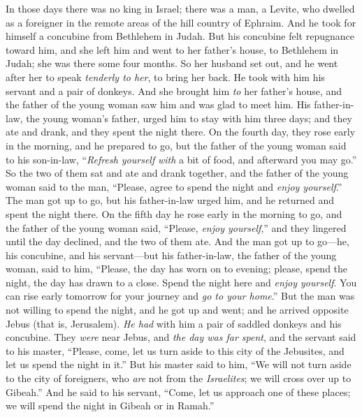 \begin{biblechapter} %
 In those days there was no king in Israel; there was a man, a Levite, who dwelled as a foreigner in the remote areas of the hill country of Ephraim. And he took for himself a concubine from Bethlehem in Judah.
\verse But his concubine felt repugnance toward him, and she left him and went to her father’s house, to Bethlehem in Judah; she was there some four months.
\verse So her husband set out, and he went after her to speak \textit{tenderly to her}, to bring her back. He took with him his servant and a pair of donkeys. And she brought him \textit{to} her father’s house, and the father of the young woman saw him and was glad to meet him.
\verse His father-in-law, the young woman’s father, urged him to stay with him three days; and they ate and drank, and they spent the night there.
\verse On the fourth day, they rose early in the morning, and he prepared to go, but the father of the young woman said to his son-in-law, “\textit{Refresh yourself} \textit{with} a bit of food, and afterward you may go.”
\verse So the two of them sat and ate and drank together, and the father of the young woman said to the man, “Please, agree to spend the night and \textit{enjoy yourself}.”
\verse The man got up to go, but his father-in-law urged him, and he returned and spent the night there.
\verse On the fifth day he rose early in the morning to go, and the father of the young woman said, “Please, \textit{enjoy yourself},” and they lingered until the day declined, and the two of them ate.
\verse And the man got up to go—he, his concubine, and his servant—but his father-in-law, the father of the young woman, said to him, “Please, the day has worn on to evening; please, spend the night, the day has drawn to a close. Spend the night here and \textit{enjoy yourself}. You can rise early tomorrow for your journey and \textit{go to your home}.”
\verse But the man was not willing to spend the night, and he got up and went; and he arrived opposite Jebus (that is, Jerusalem). \textit{He had} with him a pair of saddled donkeys and his concubine.
\verse They \textit{were} near Jebus, and \textit{the day was far spent}, and the servant said to his master, “Please, come, let us turn aside to this city of the Jebusites, and let us spend the night in it.”
\verse But his master said to him, “We will not turn aside to the city of foreigners, who \textit{are} not from the \textit{Israelites}; we will cross over up to Gibeah.”
\verse And he said to his servant, “Come, let us approach one of these places; we will spend the night in Gibeah or in Ramah.”

\end{biblechapter}
